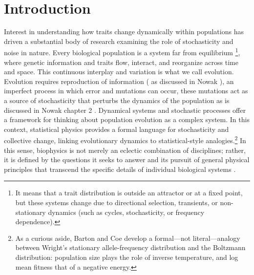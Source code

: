 \section{Introduction}

Interest in understanding how traits change dynamically within populations has driven a substantial body of research examining the role of stochasticity and noise in nature. Every biological population is a system far from equilibrium \footnote{It means that a trait distribution is outside an attractor or at a fixed point, but these systems change due to directional selection, transients, or non-stationary dynamics (such as cycles, stochasticity, or frequency dependence).}, where genetic information and traits flow, interact, and reorganize across time and space. This continuous interplay and variation is what we call evolution. Evolution requires reproduction of information (\cite{lamarckPhilosophieZoologique1809} as discussed in Nowak \cite{nowakEvolutionaryDynamicsExploring2006}), an imperfect process in which error and mutations can occur, these mutations act as a source of stochasticity that perturbs the dynamics of the population  as is discussed in Nowak chapter 2 \cite{nowakEvolutionaryDynamicsExploring2006}. Dynamical systems and stochastic processes offer a framework for thinking about population evolution as a complex system.  In this context, statistical physics provides a formal language for stochasticity and collective change, linking evolutionary dynamics to statistical-style analogies.\footnote{As a curious aside, Barton and Coe \cite{bartonApplicationStatisticalPhysics2009} develop a formal—not literal—analogy between Wright’s stationary allele-frequency distribution and the Boltzmann distribution: population size plays the role of inverse temperature, and log mean fitness that of a negative energy.} In this sense, biophysics is not merely an eclectic combination of disciplines; rather, it is defined by the questions it seeks to answer and its pursuit of general physical principles that transcend the specific details of individual biological systems \cite{bialek2012biophysics}. \\

